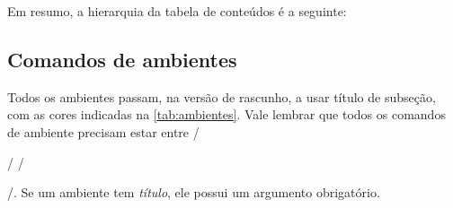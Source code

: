 {
\renewcommand*{\thefootnote}{\fnsymbol{footnote}}

Em resumo, a hierarquia da tabela de conteúdos é a seguinte:

%
}

\newpage

\subsection{Comandos de ambientes}\label{sec:comandos-ambientes}

Todos os ambientes passam, na versão de rascunho, a usar título de
subseção, com as cores indicadas na \cref{tab:ambientes}. Vale lembrar
que todos os comandos de ambiente precisam estar entre
\latexinline/\begin{comando}/ \latexinline/\end{comando}/. Se um
ambiente tem \emph{título}, ele possui um argumento obrigatório.

